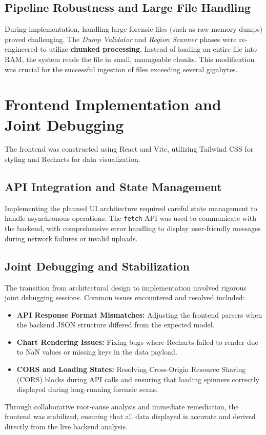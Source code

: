 \subsection{Pipeline Robustness and Large File Handling}
During implementation, handling large forensic files (such as raw memory dumps) proved challenging. The \textit{Dump Validator} and \textit{Region Scanner} phases were re-engineered to utilize \textbf{chunked processing}. Instead of loading an entire file into RAM, the system reads the file in small, manageable chunks. This modification was crucial for the successful ingestion of files exceeding several gigabytes.

\section{Frontend Implementation and Joint Debugging}
The frontend was constructed using React and Vite, utilizing Tailwind CSS for styling and Recharts for data visualization. 

\subsection{API Integration and State Management}
Implementing the planned UI architecture required careful state management to handle asynchronous operations. The \texttt{fetch} API was used to communicate with the backend, with comprehensive error handling to display user-friendly messages during network failures or invalid uploads.

\subsection{Joint Debugging and Stabilization}
The transition from architectural design to implementation involved rigorous joint debugging sessions. Common issues encountered and resolved included:
\begin{itemize}
    \item \textbf{API Response Format Mismatches:} Adjusting the frontend parsers when the backend JSON structure differed from the expected model.
    \item \textbf{Chart Rendering Issues:} Fixing bugs where Recharts failed to render due to NaN values or missing keys in the data payload.
    \item \textbf{CORS and Loading States:} Resolving Cross-Origin Resource Sharing (CORS) blocks during API calls and ensuring that loading spinners correctly displayed during long-running forensic scans.
\end{itemize}
Through collaborative root-cause analysis and immediate remediation, the frontend was stabilized, ensuring that all data displayed is accurate and derived directly from the live backend analysis.
